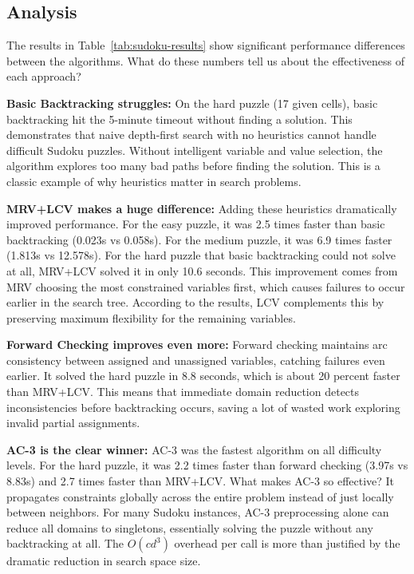 \documentclass[letterpaper]{article}
\begin{document}
\subsection{Analysis}

The results in Table~\ref{tab:sudoku-results} show significant performance differences between the algorithms. What do these numbers tell us about the effectiveness of each approach?

\textbf{Basic Backtracking struggles:} On the hard puzzle (17 given cells), basic backtracking hit the 5-minute timeout without finding a solution. This demonstrates that naive depth-first search with no heuristics cannot handle difficult Sudoku puzzles. Without intelligent variable and value selection, the algorithm explores too many bad paths before finding the solution. This is a classic example of why heuristics matter in search problems.

\textbf{MRV+LCV makes a huge difference:} Adding these heuristics dramatically improved performance. For the easy puzzle, it was 2.5 times faster than basic backtracking (0.023s vs 0.058s). For the medium puzzle, it was 6.9 times faster (1.813s vs 12.578s). For the hard puzzle that basic backtracking could not solve at all, MRV+LCV solved it in only 10.6 seconds. This improvement comes from MRV choosing the most constrained variables first, which causes failures to occur earlier in the search tree. According to the results, LCV complements this by preserving maximum flexibility for the remaining variables.

\textbf{Forward Checking improves even more:} Forward checking maintains arc consistency between assigned and unassigned variables, catching failures even earlier. It solved the hard puzzle in 8.8 seconds, which is about 20 percent faster than MRV+LCV. This means that immediate domain reduction detects inconsistencies before backtracking occurs, saving a lot of wasted work exploring invalid partial assignments.

\textbf{AC-3 is the clear winner:} AC-3 was the fastest algorithm on all difficulty levels. For the hard puzzle, it was 2.2 times faster than forward checking (3.97s vs 8.83s) and 2.7 times faster than MRV+LCV. What makes AC-3 so effective? It propagates constraints globally across the entire problem instead of just locally between neighbors. For many Sudoku instances, AC-3 preprocessing alone can reduce all domains to singletons, essentially solving the puzzle without any backtracking at all. The $O(cd^3)$ overhead per call is more than justified by the dramatic reduction in search space size.
\end{document}

